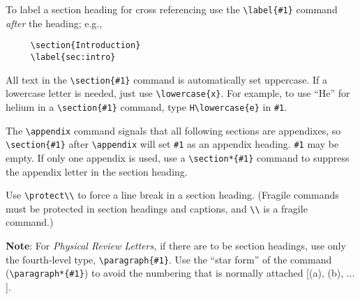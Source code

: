 To label a section heading for cross referencing use the \verb+\label{#1}+
command {\em after\/} the heading; e.g.,
\begin{verbatim}
     \section{Introduction}
     \label{sec:intro}
\end{verbatim}

All text in the \verb+\section{#1}+ command is automatically set uppercase.
If a lowercase letter is needed, just use \verb+\lowercase{x}+. For
example, to use ``He'' for helium in a \verb+\section{#1}+ command, type
\verb+H\lowercase{e}+ in \verb+#1+.

The \verb+\appendix+ command signals that all following sections are
appendixes, so \verb+\section{#1}+ after \verb+\appendix+ will set
\verb+#1+ as an appendix heading. \verb+#1+ may be empty. If only one
appendix is used, use a \verb+\section*{#1}+ command to suppress the
appendix letter in the section heading.

Use \verb+\protect\\+ to force a line break in a section heading. (Fragile
commands must be protected in section headings and captions, and \verb+\\+
is a fragile command.)

{\bf Note\/}: For {\em Physical Review Letters,} if there are to be section
headings, use only the fourth-level type, \verb+\paragraph{#1}+. Use the
``star form'' of the command (\verb+\paragraph*{#1}+) to avoid the
numbering that is normally attached [(a), (b), $\ldots$].

